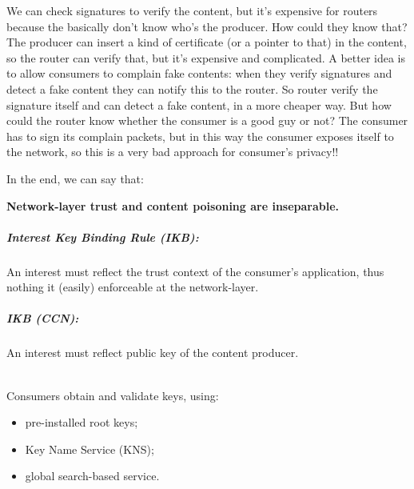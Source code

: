 We can check signatures to verify the content, but it's expensive for routers
because the basically don't know who's the producer. How could they know that?
The producer can insert a kind of certificate (or a pointer to that) in the
content, so the router can verify that, but it's expensive and complicated.
A better idea is to allow consumers to complain fake contents: when they verify
signatures and detect a fake content they can notify this to the router. So
router verify the signature itself and can detect a fake content, in a more
cheaper way. But how could the router know whether the consumer is a good guy
or not? The consumer has to sign its complain packets, but in this way the
consumer exposes itself to the network, so this is a very bad approach for
consumer's privacy!!

In the end, we can say that:

\begin{center}
\textbf{Network-layer trust and content poisoning are inseparable.}
\end{center}

\subparagraph*{Interest Key Binding Rule (IKB): }
An interest must reflect the trust context of the consumer's application, thus
nothing it (easily) enforceable at the network-layer.

\subparagraph*{IKB (CCN): }
An interest must reflect public key of the content producer.

\mbox{} \\
Consumers obtain and validate keys, using:
\begin{itemize}
	\item pre-installed root keys;
	\item Key Name Service (KNS);
	\item global search-based service.
\end{itemize}
